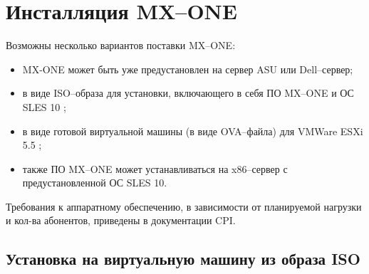 
\section{Инсталляция MX--ONE}

Возможны несколько вариантов поставки MX--ONE:
\begin{itemize}
  \item MX-ONE может быть уже предустановлен на сервер ASU или Dell--сервер;
  \item в виде ISO--образа для установки, включающего в себя ПО MX--ONE и ОС SLES 10 \cite{sles};
  \item в виде готовой виртуальной машины (в виде OVA--файла) для VMWare ESXi 5.5 \cite{vmware};
  \item также ПО MX--ONE может устанавливаться на x86--сервер с предустановленной ОС SLES 10.
\end{itemize}
Требования к аппаратному обеспечению, в зависимости от планируемой нагрузки и кол-ва абонентов, приведены в документации CPI. 

\subsection{Установка на виртуальную машину из образа ISO}

